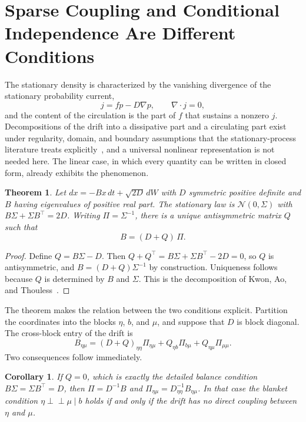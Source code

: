 \documentclass[11pt]{article}
\newtheorem{theorem}{Theorem}
\newtheorem{corollary}{Corollary}
\theoremstyle{definition}
\newcommand{\Ind}{\perp\!\!\!\perp}
\begin{document}
\section{Sparse Coupling and Conditional Independence Are Different Conditions}

The stationary density is characterized by the vanishing divergence of the stationary probability current,
\[
j=fp-D\nabla p,\qquad \nabla\!\cdot j=0,
\]
and the content of the circulation is the part of $f$ that sustains a nonzero $j$. Decompositions of the drift into a dissipative part and a circulating part exist under regularity, domain, and boundary assumptions that the stationary-process literature treats explicitly~\cite{ao2004,dacosta2021}, and a universal nonlinear representation is not needed here. The linear case, in which every quantity can be written in closed form, already exhibits the phenomenon.

\begin{theorem}
Let $dx=-Bx\,dt+\sqrt{2D}\,dW$ with $D$ symmetric positive definite and $B$ having eigenvalues of positive real part. The stationary law is $\mathcal N(0,\Sigma)$ with $B\Sigma+\Sigma B^{\top}=2D$. Writing $\Pi=\Sigma^{-1}$, there is a unique antisymmetric matrix $Q$ such that
\[
B=(D+Q)\,\Pi .
\]
\end{theorem}

\begin{proof}
Define $Q=B\Sigma-D$. Then $Q+Q^{\top}=B\Sigma+\Sigma B^{\top}-2D=0$, so $Q$ is antisymmetric, and $B=(D+Q)\Sigma^{-1}$ by construction. Uniqueness follows because $Q$ is determined by $B$ and $\Sigma$. This is the decomposition of Kwon, Ao, and Thouless~\cite{kwon2005}.
\end{proof}

The theorem makes the relation between the two conditions explicit. Partition the coordinates into the blocks $\eta$, $b$, and $\mu$, and suppose that $D$ is block diagonal. The cross-block entry of the drift is
\[
B_{\eta\mu}=(D+Q)_{\eta\eta}\Pi_{\eta\mu}+Q_{\eta b}\Pi_{b\mu}+Q_{\eta\mu}\Pi_{\mu\mu}.
\]
Two consequences follow immediately.

\begin{corollary}
If $Q=0$, which is exactly the detailed balance condition $B\Sigma=\Sigma B^{\top}=D$, then $\Pi=D^{-1}B$ and $\Pi_{\eta\mu}=D_{\eta\eta}^{-1}B_{\eta\mu}$. In that case the blanket condition $\eta\Ind\mu\mid b$ holds if and only if the drift has no direct coupling between $\eta$ and $\mu$.
\end{corollary}
\end{document}
